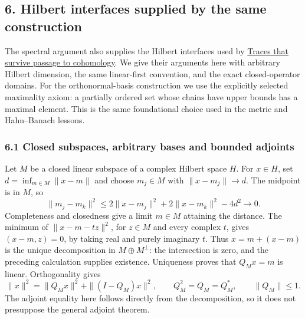 \documentclass[
  11pt,
]{article}
\begin{document}
\subsection{6. Hilbert interfaces supplied by the same
construction}\label{hilbert-interfaces-supplied-by-the-same-construction}

The spectral argument also supplies the Hilbert interfaces used by
\href{traces-and-complexes.pdf}{Traces that survive passage to
cohomology}. We give their arguments here with arbitrary Hilbert
dimension, the same linear-first convention, and the exact
closed-operator domains. For the orthonormal-basis construction we use
the explicitly selected maximality axiom: a partially ordered set whose
chains have upper bounds has a maximal element. This is the same
foundational choice used in the metric and Hahn--Banach lessons.

\subsubsection{6.1 Closed subspaces, arbitrary bases and bounded
adjoints}\label{closed-subspaces-arbitrary-bases-and-bounded-adjoints}

Let \(M\) be a closed linear subspace of a complex Hilbert space \(H\).
For \(x\in H\), set \(d=\inf_{m\in M}\|x-m\|\) and choose \(m_j\in M\)
with \(\|x-m_j\|\to d\). The midpoint is in \(M\), so \[
 \|m_j-m_k\|^2
 \leq2\|x-m_j\|^2+2\|x-m_k\|^2-4d^2\longrightarrow0.
 \tag{HF1}
\] Completeness and closedness give a limit \(m\in M\) attaining the
distance. The minimum of \(\|x-m-tz\|^2\), for \(z\in M\) and every
complex \(t\), gives \((x-m,z)=0\), by taking real and purely imaginary
\(t\). Thus \(x=m+(x-m)\) is the unique decomposition in
\(M\oplus M^\perp\): the intersection is zero, and the preceding
calculation supplies existence. Uniqueness proves that \(Q_Mx=m\) is
linear. Orthogonality gives \[
 \|x\|^2=\|Q_Mx\|^2+\|(I-Q_M)x\|^2,\qquad
 Q_M^2=Q_M=Q_M^*,\qquad \|Q_M\|\leq1 .
 \tag{HF2}
\] The adjoint equality here follows directly from the decomposition, so
it does not presuppose the general adjoint theorem.
\end{document}
